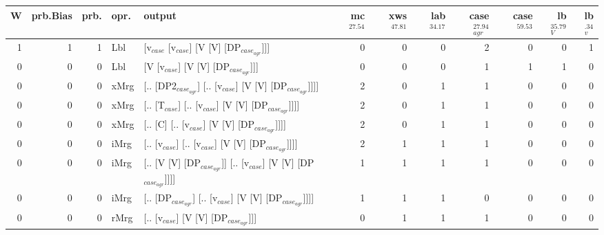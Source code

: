 \begin{tabularx}{\linewidth}{rrrlXrrrrrrr}
\hline
   W &   prb.Bias &   prb. & opr.   & output                                                         &   mc$^{27.54}$ &   xws$^{47.81}$ &   lab$^{34.17}$ &   case$_{agr}^{27.94}$ &   case$^{59.53}$ &   lb$_{V}^{35.79}$ &   lb$_{v}^{.34}$ \\
\hline
   1 &       1 &   1 & Lbl  & [v$_{case}$ [v$_{case}$] [V [V] [DP$_{case_{agr}}$]]]                        &            0 &             0 &             0 &                  2 &              0 &              0 &             1 \\
   0 &       0 &   0 & Lbl  & [V [v$_{case}$] [V [V] [DP$_{case_{agr}}$]]]                             &            0 &             0 &             0 &                  1 &              1 &              1 &             0 \\
   0 &       0 &   0 & xMrg & [.. [DP2$_{case_{agr}}$] [.. [v$_{case}$] [V [V] [DP$_{case_{agr}}$]]]]        &            2 &             0 &             1 &                  1 &              0 &              0 &             0 \\
   0 &       0 &   0 & xMrg & [.. [T$_{case}$] [.. [v$_{case}$] [V [V] [DP$_{case_{agr}}$]]]]              &            2 &             0 &             1 &                  1 &              0 &              0 &             0 \\
   0 &       0 &   0 & xMrg & [.. [C] [.. [v$_{case}$] [V [V] [DP$_{case_{agr}}$]]]]                   &            2 &             0 &             1 &                  1 &              0 &              0 &             0 \\
   0 &       0 &   0 & iMrg & [.. [v$_{case}$] [.. [v$_{case}$] [V [V] [DP$_{case_{agr}}$]]]]              &            2 &             1 &             1 &                  1 &              0 &              0 &             0 \\
   0 &       0 &   0 & iMrg & [.. [V [V] [DP$_{case_{agr}}$]] [.. [v$_{case}$] [V [V] [DP$_{case_{agr}}$]]]] &            1 &             1 &             1 &                  1 &              0 &              0 &             0 \\
   0 &       0 &   0 & iMrg & [.. [DP$_{case_{agr}}$] [.. [v$_{case}$] [V [V] [DP$_{case_{agr}}$]]]]         &            1 &             1 &             1 &                  0 &              0 &              0 &             0 \\
   0 &       0 &   0 & rMrg & [.. [v$_{case}$] [V [V] [DP$_{case_{agr}}$]]]                            &            0 &             1 &             1 &                  1 &              0 &              0 &             0 \\
\hline
\end{tabularx}\endgroup\\
